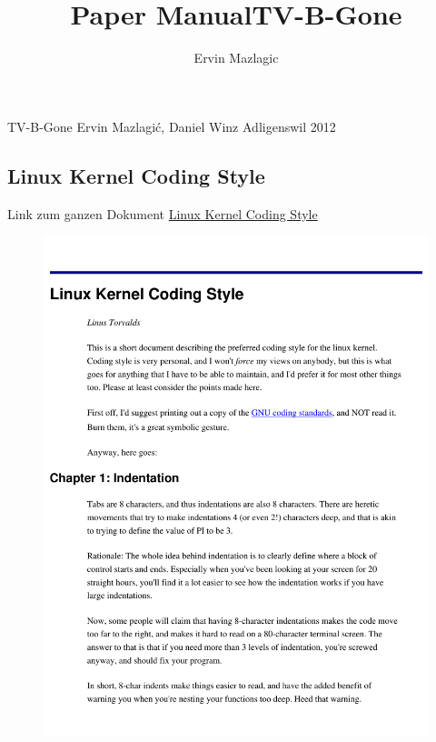 \documentclass[a4paper,
               10pt,
               fleqn]{article}
\author{Ervin Mazlagic}
\title{Paper Manual}
\title{TV-B-Gone}
\begin{document}
         {TV-B-Gone}
         {Ervin Mazlagi\'c, Daniel Winz}
         {Adligenswil}
         {2012}

\tableofcontents
\newpage







% 
% 
% 
% 

\begin{appendix}
    \clearpage
    \newpage

    \section{Linux Kernel Coding Style}
    Link zum ganzen Dokument
    \href{https://computing.llnl.gov/linux/slurm/coding_style.pdf}{
        Linux Kernel Coding Style}
    \begin{figure}[h!]
    \includegraphics[page=1, width=1\textwidth]{kernelstyle.pdf}
    \end{figure}
    \newpage


\end{appendix}
\end{document}
